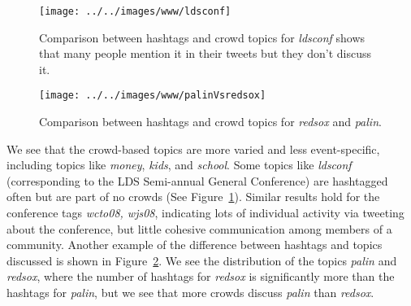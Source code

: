\documentclass{sig-alternate}
\begin{document}
\begin{figure}[!t]
\begin{center}
\texttt{[image: ../../images/www/ldsconf]}
\caption{Comparison between hashtags and crowd topics for \textit{ldsconf}
shows that many people mention it in their tweets but they don't discuss it.}
\label{fig:ldsconf}
\end{center}
\end{figure}

\begin{figure}[!t]
\begin{center}
\texttt{[image: ../../images/www/palinVsredsox]}
\caption{Comparison between hashtags and crowd topics for \textit{redsox} and
\textit{palin}. 
}
\label{fig:palin-redsox}
\end{center}
\end{figure}

We see that the crowd-based topics are more varied and less event-specific,
including topics like \textit{money}, \textit{kids}, and \textit{school}. Some
topics like \textit{ldsconf} (corresponding to the LDS Semi-annual General
Conference) are hashtagged often but are part of no crowds (See
Figure~\ref{fig:ldsconf}). Similar results hold for the conference tags
\textit{wcto08, wjs08}, indicating lots of individual activity via tweeting about
the conference, but little cohesive communication among members of a community.
Another example of the difference between hashtags and topics discussed is shown
in Figure~\ref{fig:palin-redsox}. We see the distribution of the topics
\textit{palin} and \textit{redsox}, where the number of hashtags for
\textit{redsox} is significantly more than the hashtags for \textit{palin}, but
we see that more crowds discuss \textit{palin} than \textit{redsox}.


\end{document}
